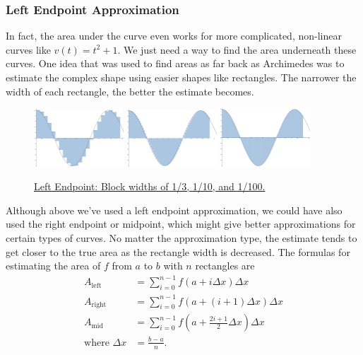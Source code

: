 \subsubsection{Left Endpoint Approximation}
In fact, the area under the curve even works for more complicated, non-linear curves like $v(t) = t^2 + 1$.
We just need a way to find the area underneath these curves.
One idea that was used to find areas as far back as Archimedes was to estimate the complex shape using easier shapes like rectangles.
The narrower the width of each rectangle, the better the estimate becomes.
 
\begin{figure}[H]
	\label{cos_blocks}
	\centering
	\includegraphics[width = 0.3\textwidth]{./integrals/cos_blocks1.png}
	\includegraphics[width = 0.3\textwidth]{./integrals/cos_blocks2.png}
	\includegraphics[width = 0.3\textwidth]{./integrals/cos_blocks3.png}
	\caption{\hyperref{}{}{}{Left Endpoint: Block widths of 1/3, 1/10, and 1/100.}}
\end{figure}

\noindent
Although above we've used a left endpoint approximation, we could have also used the right endpoint or midpoint, which might give better approximations for certain types of curves.
No matter the approximation type, the estimate tends to get closer to the true area as the rectangle width is decreased.
The formulas for estimating the area of $f$ from $a$ to $b$ with $n$ rectangles are
\begin{align*}
	A_\text{left} &= \sum_{i=0}^{n-1}{f\left(a+i\Delta x\right)\Delta x} \\
	A_\text{right} &= \sum_{i=0}^{n-1}{f\left(a+(i+1)\Delta x\right)\Delta x} \\
	A_\text{mid} &= \sum_{i=0}^{n-1}{f\left(a+\frac{2i+1}{2}\Delta x\right)\Delta x} \\
	\text{where }\Delta x &= \frac{b-a}{n}.
\end{align*}

